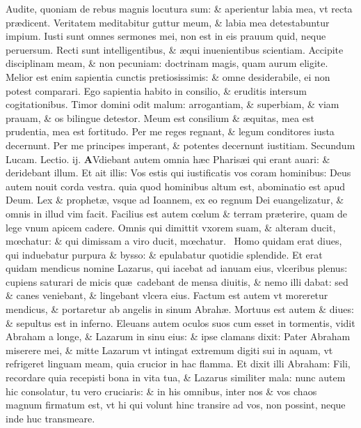 \documentclass[a5paper,10pt]{book}
\def\leftmarginnote{%
	\lrmarginnote{\hskip -\marginparsep \hskip -6.5em}}
\def\ae{æ}
\def\oe{œ}
\begin{document}
\begin{multicols*}{2}
Audite, quoniam de rebus magnis locutura sum: \& aperientur labia mea, vt recta pr\ae dicent.
Veritatem meditabitur guttur meum, \& labia mea detestabuntur impium.
Iusti sunt omnes sermones mei, non est in eis prauum quid, neque peruersum. Recti sunt intelligentibus, \& \ae qui inuenientibus scientiam.
Accipite disciplinam meam, \& non pecuniam: doctrinam magis, quam aurum eligite.
Melior est enim sapientia cunctis pretiosissimis: \& omne desiderabile, ei non potest comparari.
Ego sapientia habito in consilio, \& eruditis intersum cogitationibus.
Timor domini odit malum: arrogantiam, \& superbiam, \& viam prauam, \& os bilingue detestor.
Meum est consilium \& \ae quitas, mea est prudentia, mea est fortitudo.
Per me reges regnant, \& legum conditores iusta decernunt. Per me principes imperant, \& potentes decernunt iustitiam.
\newline \color{red} Secundum Lucam. \hfill Lectio. ij. \color{black}
\vspace{-.25em}
\lettrine[lines=2]{\bfseries \color{red} A}{}Vdiebant\leftmarginnote{\begin{flushright}c. 16.\end{flushright}} autem omnia h\ae c Pharis\ae i qui erant auari: \& deridebant illum.
Et ait illis: Vos estis qui iustificatis vos coram hominibus: Deus autem nouit corda vestra. quia quod hominibus altum est, abominatio est apud Deum.
Lex \& prophet\ae , vsque ad Ioannem, ex eo regnum Dei euangelizatur, \& omnis in illud vim facit.
Facilius est autem c\oe lum \& terram pr\ae terire, quam de lege vnum apicem cadere.
Omnis qui dimittit vxorem suam, \& alteram ducit, m\oe chatur: \& qui dimissam a viro ducit, m\oe chatur. \textdagger \ 
Homo\leftmarginnote{\begin{flushright}C\end{flushright}} quidam erat diues, qui induebatur purpura \& bysso: \& epulabatur quotidie splendide.
Et erat quidam mendicus nomine Lazarus, qui iacebat ad ianuam eius, vlceribus plenus: cupiens saturari de micis qu\ae \ cadebant de mensa
diuitis, \& nemo illi dabat: sed \& canes veniebant, \& lingebant vlcera eius.
Factum est autem vt moreretur mendicus, \& portaretur ab angelis in sinum Abrah\ae .
Mortuus est autem \& diues: \& sepultus est in inferno. Eleuans autem oculos suos cum esset in tormentis, vidit Abraham a longe, \& Lazarum in sinu eius: \& ipse clamans dixit: Pater Abraham miserere mei, \& mitte Lazarum vt intingat extremum digiti sui in aquam, vt refrigeret linguam meam, quia crucior in hac flamma.
Et dixit illi Abraham: Fili, recordare quia recepisti bona in vita tua, \& Lazarus similiter mala: nunc autem hic consolatur, tu vero cruciaris: \& in his omnibus, inter nos \& vos chaos magnum firmatum est, vt hi qui volunt hinc transire ad vos, non possint, neque inde huc transmeare.

\end{multicols*}
\end{document}

